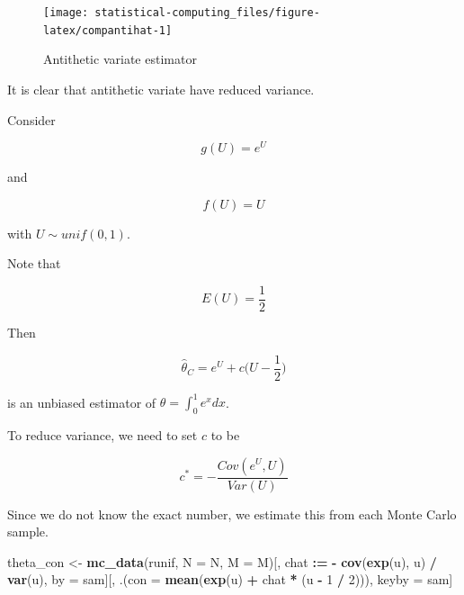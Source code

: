 \documentclass[]{book}
\newenvironment{Shaded}{\begin{snugshade}}{\end{snugshade}}
\newcommand{\DataTypeTok}[1]{\textcolor[rgb]{0.13,0.29,0.53}{#1}}
\newcommand{\DecValTok}[1]{\textcolor[rgb]{0.00,0.00,0.81}{#1}}
\newcommand{\ErrorTok}[1]{\textcolor[rgb]{0.64,0.00,0.00}{\textbf{#1}}}
\newcommand{\KeywordTok}[1]{\textcolor[rgb]{0.13,0.29,0.53}{\textbf{#1}}}
\newcommand{\NormalTok}[1]{#1}
\newcommand{\OperatorTok}[1]{\textcolor[rgb]{0.81,0.36,0.00}{\textbf{#1}}}
\newcommand{\StringTok}[1]{\textcolor[rgb]{0.31,0.60,0.02}{#1}}
\theoremstyle{definition}
\theoremstyle{definition}
\theoremstyle{definition}
\theoremstyle{remark}
\let\BeginKnitrBlock\begin \let\EndKnitrBlock\end
\begin{document}
\begin{figure}[H]

{\centering \texttt{[image: statistical-computing\_files/figure-latex/compantihat-1]} 

}

\caption{Antithetic variate estimator}\label{fig:compantihat}
\end{figure}

It is clear that antithetic variate have reduced variance.

\BeginKnitrBlock{solution}[Control variate]
{}Consider

\[g(U) = e^U\]

and

\[f(U) = U\]

with \(U \sim unif(0, 1)\).

Note that

\[E(U) = \frac{1}{2}\]

Then

\[\hat\theta_C = e^U + c\bigg(U - \frac{1}{2}\bigg)\]

is an unbiased estimator of \(\theta = \int_0^1 e^xdx\).

To reduce variance, we need to set \(c\) to be

\[c^{\ast} = -\frac{Cov(e^U, U)}{Var(U)}\]
\EndKnitrBlock{solution}

Since we do not know the exact number, we estimate this from each Monte Carlo sample.

\begin{Shaded}
\begin{Highlighting}[]
\NormalTok{theta_con <-}
\StringTok{  }\KeywordTok{mc_data}\NormalTok{(runif, }\DataTypeTok{N =}\NormalTok{ N, }\DataTypeTok{M =}\NormalTok{ M)[,}
\NormalTok{                               chat }\OperatorTok{:}\ErrorTok{=}\StringTok{ }\OperatorTok{-}\StringTok{ }\KeywordTok{cov}\NormalTok{(}\KeywordTok{exp}\NormalTok{(u), u) }\OperatorTok{/}\StringTok{ }\KeywordTok{var}\NormalTok{(u),}
\NormalTok{                               by =}\StringTok{ }\NormalTok{sam][,}
\NormalTok{                                         .(}\DataTypeTok{con =} \KeywordTok{mean}\NormalTok{(}\KeywordTok{exp}\NormalTok{(u) }\OperatorTok{+}\StringTok{ }\NormalTok{chat }\OperatorTok{*}\StringTok{ }\NormalTok{(u }\OperatorTok{-}\StringTok{ }\DecValTok{1} \OperatorTok{/}\StringTok{ }\DecValTok{2}\NormalTok{))),}
\NormalTok{                                         keyby =}\StringTok{ }\NormalTok{sam]}
\end{Highlighting}
\end{Shaded}
\end{document}
